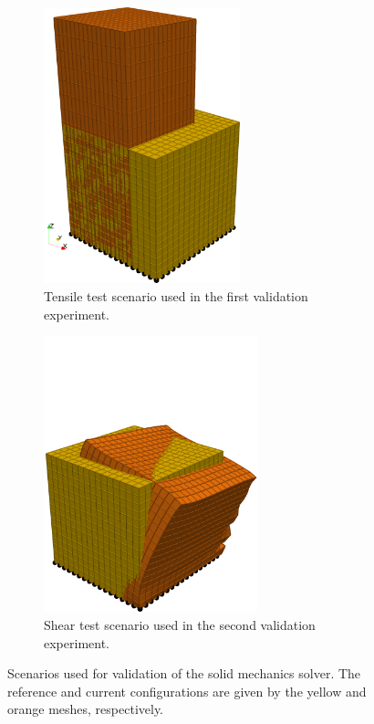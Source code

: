 \begin{figure}
  \centering%
  \hfill
  \begin{subfigure}[t]{0.45\textwidth}%
    \centering%
    \includegraphics[height=8cm]{images/results/basic/tensile_test_img.png}%
    \caption{Tensile test scenario used in the first validation experiment.}%
    \label{fig:tensile_test_img}%
  \end{subfigure}\hfill
  \begin{subfigure}[t]{0.45\textwidth}%
    \centering%
    \includegraphics[height=8cm]{images/results/basic/shear_test_img.png}%
    \caption{Shear test scenario used in the second validation experiment.}%
    \label{fig:shear_test_img}%
  \end{subfigure}
  \hfill
  \caption{Scenarios used for validation of the solid mechanics solver. The reference and current configurations are given by the yellow and orange meshes, respectively.}%
  \label{fig:tensile_shear_test_img}%
\end{figure}%

